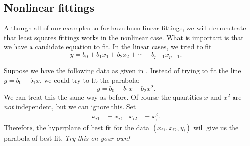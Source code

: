 \documentclass[a4paper, 12pt]{article}
\numberwithin{equation}{section}
\numberwithin{figure}{section}
\theoremstyle{definition}
\begin{document}
\subsection{Nonlinear fittings}\label{sec:nonlinear-fittings}

Although all of our examples so far have been linear fittings, we will
demonstrate that least squares fittings works in the nonlinear case. What is
important is that we have a candidate equation to fit. In the linear cases, we
tried to fit 
\[ 
	y = b_0 + b_1x_1 + b_2x_2 + \cdots + b_{p-1}x_{p-1}.
\] 

Suppose we have the following data as given in .
Instead of trying to fit the line $y=b_0+b_1x$, we could try to fit the
parabola: 
\[ 
	y = b_0 + b_1x + b_2x^2. 
\] 
We can treat this the same way as before. Of course the quantities $x$ and $x^2$ are \textit{not} independent, but we can ignore this. Set 
\begin{align*} 
	x_{i1} &= x_i, & x_{i2} &= x_i^2.
\end{align*} 
Therefore, the hyperplane of best fit for the data $(x_{i1}, x_{i2}, y_i)$ will
give us the parabola of best fit. \textit{Try this on your own!} 
\end{document}
